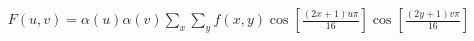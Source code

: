 \documentclass[preview]{standalone}
\begin{document}
\begin{align*}
F(u,v) = \alpha(u)\alpha(v)\sum_{x}\sum_{y} f(x,y)\cos\!\left[\frac{(2x+1)u\pi}{16}\right]\cos\!\left[\frac{(2y+1)v\pi}{16}\right]
\end{align*}
\end{document}
